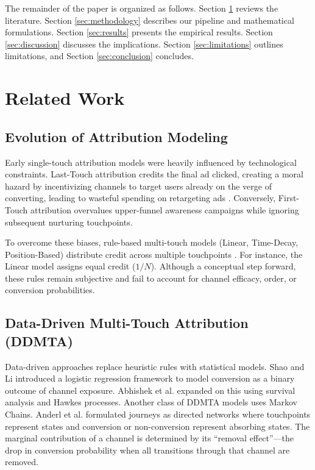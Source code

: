 \documentclass[pdflatex,sn-basic,Numbered]{sn-jnl}
\begin{document}
The remainder of the paper is organized as follows. Section \ref{sec:related} reviews the literature. Section \ref{sec:methodology} describes our pipeline and mathematical formulations. Section \ref{sec:results} presents the empirical results. Section \ref{sec:discussion} discusses the implications. Section \ref{sec:limitations} outlines limitations, and Section \ref{sec:conclusion} concludes.

\section{Related Work}\label{sec:related}

\subsection{Evolution of Attribution Modeling}

Early single-touch attribution models were heavily influenced by technological constraints. Last-Touch attribution credits the final ad clicked, creating a moral hazard by incentivizing channels to target users already on the verge of converting, leading to wasteful spending on retargeting ads \cite{berman2018lasttouch}. Conversely, First-Touch attribution overvalues upper-funnel awareness campaigns while ignoring subsequent nurturing touchpoints.

To overcome these biases, rule-based multi-touch models (Linear, Time-Decay, Position-Based) distribute credit across multiple touchpoints \cite{jayawardane2015review}. For instance, the Linear model assigns equal credit ($1/N$). Although a conceptual step forward, these rules remain subjective and fail to account for channel efficacy, order, or conversion probabilities.

\subsection{Data-Driven Multi-Touch Attribution (DDMTA)}

Data-driven approaches replace heuristic rules with statistical models. Shao and Li \cite{shao2011mta} introduced a logistic regression framework to model conversion as a binary outcome of channel exposure. Abhishek et al. \cite{abhishek2012media} expanded on this using survival analysis and Hawkes processes. Another class of DDMTA models uses Markov Chains. Anderl et al. \cite{anderl2016journey} formulated journeys as directed networks where touchpoints represent states and conversion or non-conversion represent absorbing states. The marginal contribution of a channel is determined by its ``removal effect''---the drop in conversion probability when all transitions through that channel are removed.
\end{document}
